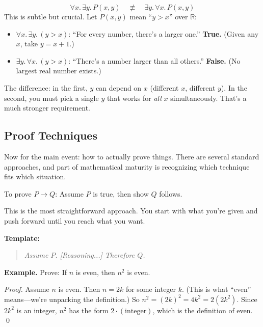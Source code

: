 \begin{theorem}
\[
\forall x.\, \exists y.\, P(x,y) \quad \not\equiv \quad \exists y.\, \forall x.\, P(x,y)
\]
This is subtle but crucial. Let $P(x,y)$ mean ``$y > x$'' over $\mathbb{R}$:
\begin{itemize}
  \item $\forall x.\, \exists y.\, (y > x)$: ``For every number, there's a larger one.'' \textbf{True.} (Given any $x$, take $y = x + 1$.)
  \item $\exists y.\, \forall x.\, (y > x)$: ``There's a number larger than all others.'' \textbf{False.} (No largest real number exists.)
\end{itemize}

The difference: in the first, $y$ can depend on $x$ (different $x$, different $y$). In the second, you must pick a single $y$ that works for \emph{all} $x$ simultaneously. That's a much stronger requirement.
\end{theorem}

\subsection*{Proof Techniques}

Now for the main event: how to actually prove things. There are several standard approaches, and part of mathematical maturity is recognizing which technique fits which situation.

\begin{strategy}
To prove $P \to Q$: Assume $P$ is true, then show $Q$ follows.

This is the most straightforward approach. You start with what you're given and push forward until you reach what you want.

\textbf{Template:}
\begin{quote}
\emph{Assume $P$. [Reasoning...] Therefore $Q$.}
\end{quote}

\textbf{Example.} Prove: If $n$ is even, then $n^2$ is even.

\emph{Proof.} Assume $n$ is even. Then $n = 2k$ for some integer $k$. (This is what ``even'' means---we're unpacking the definition.) So $n^2 = (2k)^2 = 4k^2 = 2(2k^2)$. Since $2k^2$ is an integer, $n^2$ has the form $2 \cdot (\text{integer})$, which is the definition of even. \qed
\end{strategy}


